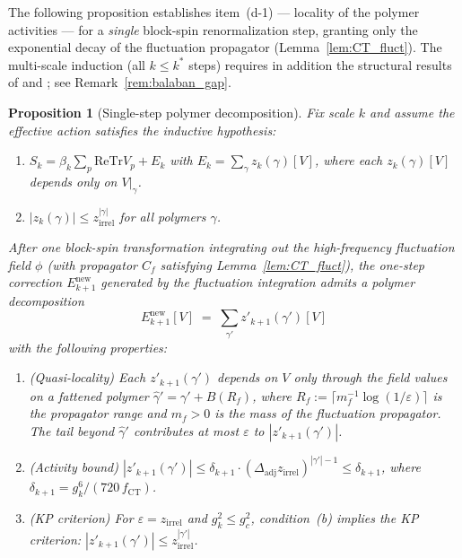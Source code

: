 \documentclass[11pt,a4paper]{amsart}
\newtheorem{proposition}[theorem]{Proposition}
\theoremstyle{definition}
\newcommand{\re}{\mathrm{Re}}
\newcommand{\Tr}{\mathrm{Tr}}
\newcommand{\Cf}{C_f}
\newcommand{\gB}{g^2_c}
\newcommand{\CT}{\mathrm{CT}}
\begin{document}
The following proposition establishes item~(d-1) --- locality of the polymer
activities --- for a \emph{single} block-spin renormalization step, granting
only the exponential decay of the fluctuation propagator (Lemma~\ref{lem:CT_fluct}).
The multi-scale induction (all $k \le k^*$ steps) requires in addition
the structural results of \cite[Thm.~2.1]{B87} and \cite[Thm.~1.1]{B88};
see Remark~\ref{rem:balaban_gap}.

\begin{proposition}[Single-step polymer decomposition]
\label{prop:single_step_polymer}
Fix scale $k$ and assume the effective action satisfies the inductive hypothesis:
\begin{enumerate}[label=(\roman*)]
\item $S_k = \beta_k\sum_p\re\Tr V_p + E_k$ with $E_k = \sum_\gamma z_k(\gamma)[V]$,
      where each $z_k(\gamma)[V]$ depends only on $V\big|_\gamma$.
\item $|z_k(\gamma)| \le z_{\mathrm{irrel}}^{|\gamma|}$ for all polymers $\gamma$.
\end{enumerate}
After one block-spin transformation integrating out the high-frequency fluctuation field
$\phi$ (with propagator $\Cf$ satisfying Lemma~\ref{lem:CT_fluct}),
the one-step correction $E^{\mathrm{new}}_{k+1}$ generated by the fluctuation
integration admits a polymer decomposition
\begin{equation}
\label{eq:single_step_decomp}
  E^{\mathrm{new}}_{k+1}[V] \;=\; \sum_{\gamma'} z'_{k+1}(\gamma')[V]
\end{equation}
with the following properties:
\begin{enumerate}[label=(\alph*)]
\item \emph{(Quasi-locality)} Each $z'_{k+1}(\gamma')$ depends on $V$ only through
      the field values on a fattened polymer $\hat\gamma' = \gamma' + B(R_f)$, where
      $R_f := \lceil m_f^{-1}\log(1/\varepsilon)\rceil$ is the propagator range
      and $m_f > 0$ is the mass of the fluctuation propagator.  The tail beyond
      $\hat\gamma'$ contributes at most $\varepsilon$ to $|z'_{k+1}(\gamma')|$.
\item \emph{(Activity bound)}
      $|z'_{k+1}(\gamma')| \le \delta_{k+1} \cdot (\Delta_{\mathrm{adj}} z_{\mathrm{irrel}})^{|\gamma'|-1}
      \le \delta_{k+1}$, where $\delta_{k+1} = g^6_k/(720\,f_{\CT})$.
\item \emph{(KP criterion)} For $\varepsilon = z_{\mathrm{irrel}}$ and $g^2_k \le \gB$,
      condition~(b) implies the KP criterion: $|z'_{k+1}(\gamma')| \le z_{\mathrm{irrel}}^{|\gamma'|}$.
\end{enumerate}
\end{proposition}
\end{document}
